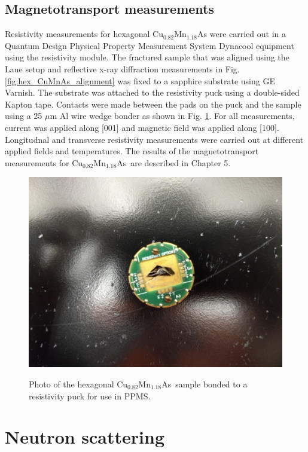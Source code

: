 \documentclass[10pt,doublespacing,edeposit]{uiucthesis2020}
\newcommand*{\cumnas}{Cu$_{0.82}$Mn$_{1.18}$As}
\begin{document}
\begin{mainmatter}
\subsection{Magnetotransport measurements}


Resistivity measurements for hexagonal Cu$_{0.82}$Mn$_{1.18}$As were carried out in a Quantum Design Physical Property Measurement System Dynacool equipment using the resistivity module. The fractured sample that was aligned using the Laue setup and reflective x-ray diffraction measurements in Fig. \ref{fig:hex_CuMnAs_alignment} was fixed to a sapphire substrate using GE Varnish. The substrate was attached to the resistivity puck using a double-sided Kapton tape. Contacts were made between the pads on the puck and the sample using a 25 $\mu$m Al wire wedge bonder as shown in Fig. \ref{fig:resistivity}. For all measurements, current was applied along [001] and magnetic field was applied along [100]. Longitudnal and transverse resistivity measurements were carried out at different applied fields and temperatures. The results of the magnetotransport measurements for \cumnas\  are described in Chapter 5.

\begin{figure}
\centering\includegraphics[width=0.5\columnwidth]{figures/ch3/resistivity.jpg} \\
\caption{\label{fig:resistivity}
Photo of the hexagonal \cumnas\ sample bonded to a resistivity puck for use in PPMS.
}
\end{figure}



\section{Neutron scattering}


\end{mainmatter}
\end{document}

